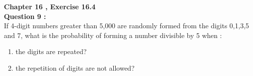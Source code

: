 \documentclass[journal,12pt,onecolumn]{IEEEtran}
\begin{document}
%

\large
\textbf{Chapter 16 , Exercise 16.4 }\\

\textbf{Question 9 :}\\
If 4-digit numbers greater than 5,000 are randomly formed from the digits 0,1,3,5 and 7, what is the probability of forming a number divisible by 5 when : 
\begin{enumerate}
    \item  the digits are repeated?
    
    \item the repetition of digits are not allowed?
    
\end{enumerate}


\solution





           


 
\end{document}
